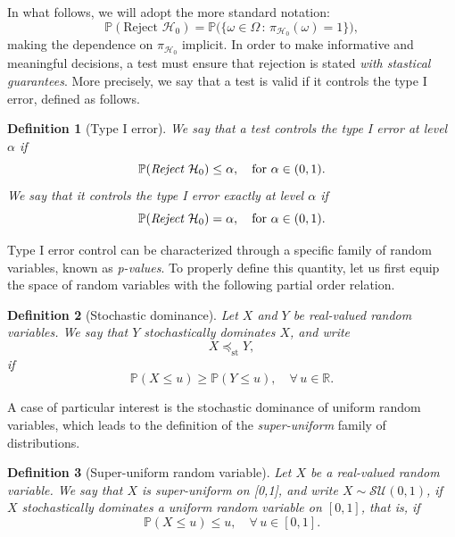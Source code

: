\documentclass[a4paper,11pt]{article}
\theoremstyle{plain}
\newcommand{\1}{\mathbf{1}}
\newtheorem{definition}{Definition}
\begin{document}
In what follows, we will adopt the more standard notation:
\begin{equation*}
\mathbb{P}\left(\text{Reject } \mathcal{H}_0\right) = \mathbb{P}\bigl(\lbrace \omega \in \Omega\,:\,\pi_{\mathcal{H}_0}(\omega)=1\rbrace\bigr),
\end{equation*}
making the dependence on $\pi_{\mathcal{H}_0}$ implicit. In order to make informative and meaningful decisions, a test must ensure that rejection is stated \textit{with stastical guarantees}. More precisely,  we say that a test is valid if it controls the type I error, defined as follows.

\begin{definition}[Type I error]\label{def_type_error}
  We say that a test controls the type I error at level $\alpha$ if
 \begin{equation*}
    \mathbb{P}(\emph{Reject }\mathcal{H}_0) \leq \alpha, \quad \text{for }\alpha \in (0,1).
  \end{equation*}
  We say that it controls  the type I error exactly at level $\alpha$ if
  \begin{equation*}
    \mathbb{P}(\emph{Reject }\mathcal{H}_0) = \alpha, \quad\text{for } \alpha \in (0,1).
  \end{equation*}
\end{definition}

Type I error control can be characterized through a specific family of random variables, known as \textit{p-values}. To properly define this quantity, let us first  equip the space of random variables with the following  partial order relation.

\begin{definition}[Stochastic dominance]\label{def_sto_def}
  Let $X$ and $Y$ be real-valued random variables.
  We say that $Y$ stochastically dominates $X$, and write
  \begin{equation*}
    X \preceq_{\mathrm{st}} Y,
  \end{equation*}
  if
  \begin{equation}
    \mathbb{P}(X \leq u) \geq \mathbb{P}(Y \leq u), \quad \forall\, u \in \mathbb{R}.
  \end{equation}
\end{definition}

A case of particular interest is the stochastic dominance of uniform random variables, which leads to the definition of the \textit{super-uniform} family of distributions.

\begin{definition}[Super-uniform random variable]\label{def_super_unif}
  Let $X$ be a real-valued random variable. We say that $X$ is super-uniform on [0,1], and write
  $X \sim \mathcal{SU}(0,1)$, if $X$ stochastically dominates a uniform random
  variable on $[0,1]$, that is, if
  \begin{equation}
    \mathbb{P}(X \leq u) \leq u, \quad \forall\, u \in [0,1].
  \end{equation}
\end{definition}
\end{document}
